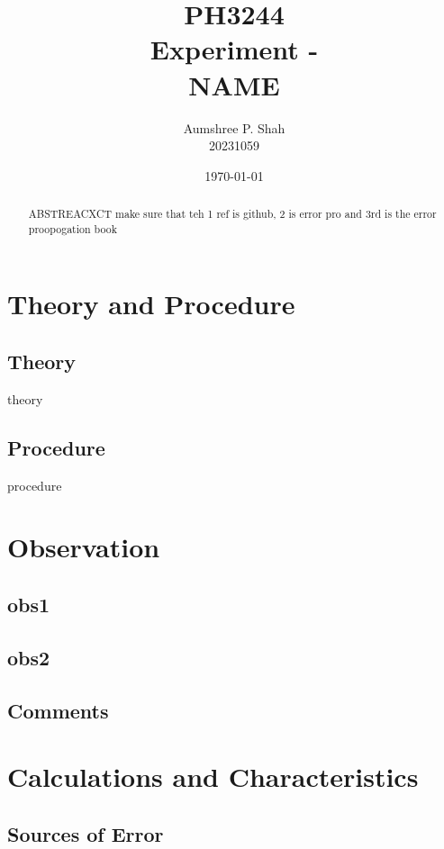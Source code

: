 \documentclass[%
sor,
 jor,
 amsmath,amssymb,
 reprint,
]{revtex4-2}
\begin{document}
\title{PH3244\\Experiment - \\ NAME}
\author{Aumshree P. Shah\\20231059}
\date{\today}
\begin{abstract}
\centering
ABSTREACXCT
make sure that teh 1 ref is github, 2 is error pro and 3rd is the error proopogation book
\end{abstract}
\maketitle
\tableofcontents
\vspace*{\fill}
\pagebreak




\section{Theory and Procedure}
\subsection{Theory}
theory
\subsection{Procedure}
procedure	

\section{Observation}

\subsection{obs1}
\subsection{obs2}
\subsection{Comments}

\section{Calculations and Characteristics}
\subsection{Sources of Error}
\end{document}
